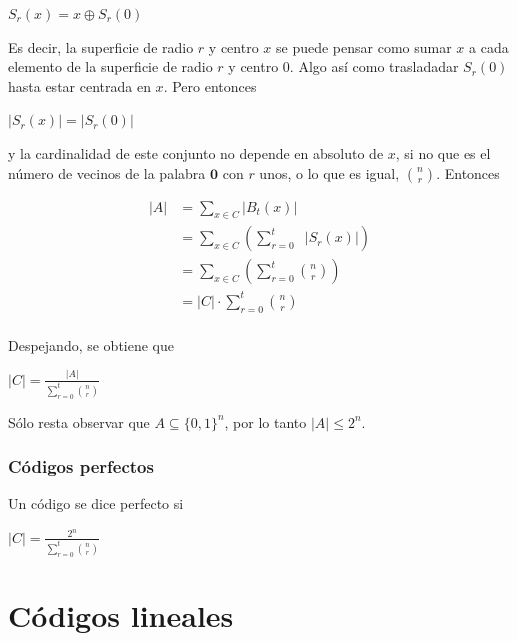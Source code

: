 \documentclass[10pt,a4paper]{article}
\begin{document}
\begin{center}
$S_r(x) = x \oplus S_r(0)$
\end{center}

Es decir, la superficie de radio $r$ y centro $x$ se puede pensar como sumar $x$ a cada elemento de la superficie de radio $r$ y centro $0$. Algo así como trasladadar $S_r(0)$ hasta estar centrada en $x$. Pero entonces

\begin{center}
$\lvert S_r(x) \rvert = \lvert S_r(0)\rvert $
\end{center}

y la cardinalidad de este conjunto no depende en absoluto de $x$, si no que es el número de vecinos de la palabra $\textbf{0}$ con $r$ unos, o lo que es igual, ${n \choose r}$. Entonces

\begin{center}
\begin{align*} \lvert A \rvert &= \sum\limits_{x \in C} \lvert B_t(x) \rvert \\ &= \sum\limits_{x \in C} \left( \sum\limits_{r=0}^t \;\;\lvert S_r(x)\rvert\right)\\ &= \sum\limits_{x \in C} \left( \sum\limits_{r=0}^t {n \choose r}\right)\\ &= \lvert C \rvert \cdot \sum\limits_{r=0}^t {n \choose r}\\ \end{align*}
\end{center}

Despejando, se obtiene que

\begin{center}
$ \lvert C \rvert = \frac{\lvert A \rvert }{ \sum\limits_{r=0}^t {n \choose r}}$
\end{center}

Sólo resta observar que $A \subseteq \{0, 1\}^n$, por lo tanto $\lvert A \rvert \leq 2^n$.

\subsubsection*{Códigos perfectos}

Un código se dice perfecto si

\begin{center}
$ \lvert C \rvert = \frac{2^n }{ \sum\limits_{r=0}^t {n \choose r}}$
\end{center}

\section*{Códigos lineales}
\end{document}
